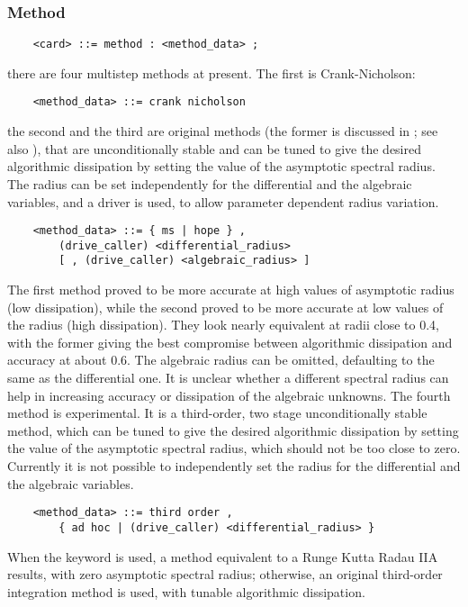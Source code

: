 \subsubsection{Method}
\begin{verbatim}
    <card> ::= method : <method_data> ;
\end{verbatim}
there are four multistep methods at present. 
The first is Crank-Nicholson:
\begin{verbatim}
    <method_data> ::= crank nicholson
\end{verbatim}
the second and the third are original 
methods (the former is discussed in \cite{MASARATI-LANZ-MANTEGAZZA-2001}; 
see also 
), 
that are unconditionally stable and can be tuned to give 
the desired algorithmic dissipation
by setting the value of the asymptotic spectral radius.
The radius can be set independently for the differential
and the algebraic variables, and a driver is used, to allow parameter 
dependent radius variation.
\begin{verbatim}
    <method_data> ::= { ms | hope } ,
        (drive_caller) <differential_radius>
        [ , (drive_caller) <algebraic_radius> ]
\end{verbatim}
The first method proved to be more accurate at high values of asymptotic
radius (low dissipation), while the second proved to be more accurate
at low values of the radius (high dissipation).
They look nearly equivalent at radii close to 0.4, with the former
giving the best compromise between algorithmic dissipation and accuracy 
at about 0.6.
The algebraic radius can be omitted, defaulting to the same 
as the differential one.
It is unclear whether a different spectral radius can help in increasing
accuracy or dissipation of the algebraic unknowns.
The fourth method is experimental. It is a third-order,
two stage unconditionally stable method, which can be tuned to give 
the desired algorithmic dissipation by setting the value 
of the asymptotic spectral radius, which should not be 
too close to zero.
Currently it is not possible to independently set the radius 
for the differential and the algebraic variables.
\begin{verbatim}
    <method_data> ::= third order ,
        { ad hoc | (drive_caller) <differential_radius> }
\end{verbatim}
When the keyword  is used, a method equivalent
to a Runge Kutta Radau IIA results, with zero asymptotic
spectral radius; otherwise, an original third-order
integration method is used, with tunable algorithmic dissipation.

